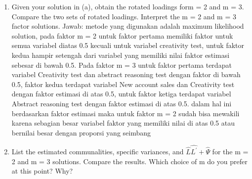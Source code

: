 \documentclass[
]{article}
\begin{document}
\begin{enumerate}
\def\labelenumi{(\alph{enumi})}
\setcounter{enumi}{1}
\item
  Given your solution in (a), obtain the rotated loadings form = 2 and m
  = 3. Compare the two sets of rotated loadings. Interpret the m = 2 and
  m = 3 factor solutions. Jawab: metode yang digunakan adalah maximum
  likelihood solution, pada faktor m = 2 untuk faktor pertama memiliki
  faktor untuk semua variabel diatas 0.5 kecuali untuk variabel
  creativity test, untuk faktor kedua hampir setengah dari variabel yang
  memiliki nilai faktor estimasi sebesar di bawah 0.5. Pada faktor m = 3
  untuk faktor pertama terdapat variabel Creativity test dan abstract
  reasoning test dengan faktor di bawah 0.5, faktor kedua terdapat
  variabel New account sales dan Creativity test dengan faktor estimasi
  di atas 0.5, untuk faktor ketiga terdapat variabel Abstract reasoning
  test dengan faktor estimasi di atas 0.5. dalam hal ini berdasarkan
  faktor estimasi maka untuk faktor m = 2 sudah bisa mewakili karena
  sebagian besar variabel faktor yang memiliki nilai di atas 0.5 atau
  bernilai besar dengan proporsi yang seimbang
\item
  List the estimated communalities, specific variances, and
  \(\hat{L}\hat{L^{'}} + \hat{\Psi}\) for the m = 2 and m = 3 solutions.
  Compare the results. Which choice of m do you prefer at this point?
  Why?
\end{enumerate}
\end{document}

